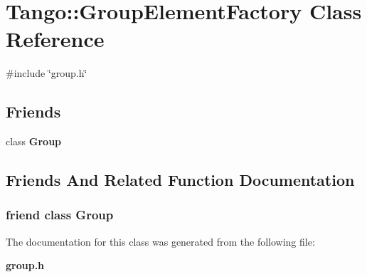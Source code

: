 \section{Tango\-:\-:Group\-Element\-Factory Class Reference}
\label{classTango_1_1GroupElementFactory}


{\ttfamily \#include \char`\"{}group.\-h\char`\"{}}

\subsection*{Friends}
\begin{DoxyCompactItemize}
\item 
class {\bf Group}
\end{DoxyCompactItemize}


\subsection{Friends And Related Function Documentation}
\subsubsection[{Group}]{\setlength{\rightskip}{0pt plus 5cm}friend class {\bf Group}\hspace{0.3cm}{\ttfamily [friend]}}\label{classTango_1_1GroupElementFactory_a2697825715974a353728f0d4d5658112}


The documentation for this class was generated from the following file\-:\begin{DoxyCompactItemize}
\item 
{\bf group.\-h}\end{DoxyCompactItemize}
